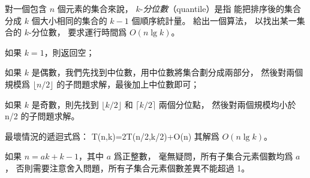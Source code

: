 \startEXERCISE
對一個包含 $n$ 個元素的集合來說，
 $k$-\emph{分位數}（quantile）是指
能把排序後的集合分成 $k$ 個大小相同的集合的 $k-1$ 個順序統計量。
給出一個算法，
以找出某一集合的 $k$-分位數，
要求運行時間爲 $O(n\lg{k})$。
\stopEXERCISE

\startANSWER
\startigNum
\item 如果 $k=1$，則返回空；
\item 如果 $k$ 是偶數，我們先找到中位數，用中位數將集合劃分成兩部分，
然後對兩個規模爲 $\lfloor n/2 \rfloor$ 的子問題求解，最後加上中位數即可；
\item 如果 $k$ 是奇數，則先找到 $\lfloor k/2\rfloor$ 和 $\lceil k/2\rceil$ 兩個分位點，
然後對兩個規模均小於 n/2 的子問題求解。
\stopigNum

最壞情況的遞迴式爲：
\startformula
T(n,k)=2T(\lfloor n/2\rfloor,k/2)+O(n)
\stopformula
其解爲 $O(n\lg{k})$。

如果 $n=ak+k-1$，其中 $a$ 爲正整數，
毫無疑問，所有子集合元素個數均爲 $a$，
否則需要注意舍入問題，所有子集合元素個數差異不能超過 1。
\stopANSWER
